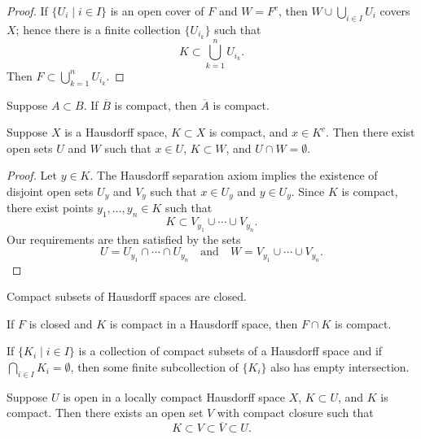\begin{proof}
If $\{U_i\mid i\in I\}$ is an open cover of $F$ and $W=F^c$, then $W\cup\bigcup_{i\in I}U_i$ covers $X$; hence there is a finite collection $\{U_{i_k}\}$ such that
\[K\subset\bigcup_{k=1}^{n}U_{i_k}.\]
Then $F\subset\bigcup_{k=1}^{n}U_{i_k}$.
\end{proof}

\begin{corollary}
Suppose $A\subset B$. If $\overline{B}$ is compact, then $\overline{A}$ is compact.
\end{corollary}

\begin{proposition}
Suppose $X$ is a Hausdorff space, $K\subset X$ is compact, and $x\in K^c$. 
Then there exist open sets $U$ and $W$ such that $x\in U$, $K\subset W$, and $U\cap W=\emptyset$.
\end{proposition}

\begin{proof}
Let $y\in K$. The Hausdorff separation axiom implies the existence of disjoint open sets $U_y$ and $V_y$ such that $x\in U_y$ and $y\in U_y$. 
Since $K$ is compact, there exist points $y_1,\dots,y_n\in K$ such that
\[K\subset V_{y_1}\cup\cdots\cup V_{y_n}.\]
Our requirements are then satisfied by the sets
\[U=U_{y_1}\cap\cdots\cap U_{y_n}\quad\text{and}\quad W=V_{y_1}\cup\cdots\cup V_{y_n}.\]
\end{proof}

\begin{corollary}
Compact subsets of Hausdorff spaces are closed.
\end{corollary}

\begin{corollary}
If $F$ is closed and $K$ is compact in a Hausdorff space, then $F\cap K$ is compact.
\end{corollary}

\begin{proposition}
If $\{K_i\mid i\in I\}$ is a collection of compact subsets of a Hausdorff space and if $\bigcap_{i\in I}K_i=\emptyset$, then some finite subcollection of $\{K_i\}$ also has empty intersection.
\end{proposition}

\begin{proposition}
Suppose $U$ is open in a locally compact Hausdorff space $X$, $K\subset U$, and $K$ is compact. 
Then there exists an open set $V$ with compact closure such that
\[K\subset V\subset\overline{V}\subset U.\]
\end{proposition}
\pagebreak


